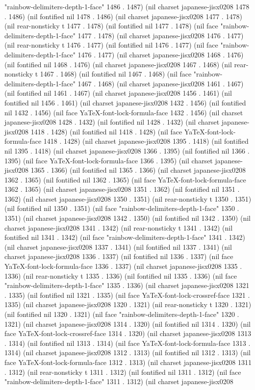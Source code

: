 "rainbow-delimiters-depth-1-face" 1486 . 1487) (nil charset japanese-jisx0208 1478 . 1486) (nil fontified nil 1478 . 1486) (nil charset japanese-jisx0208 1477 . 1478) (nil rear-nonsticky t 1477 . 1478) (nil fontified nil 1477 . 1478) (nil face "rainbow-delimiters-depth-1-face" 1477 . 1478) (nil charset japanese-jisx0208 1476 . 1477) (nil rear-nonsticky t 1476 . 1477) (nil fontified nil 1476 . 1477) (nil face "rainbow-delimiters-depth-1-face" 1476 . 1477) (nil charset japanese-jisx0208 1468 . 1476) (nil fontified nil 1468 . 1476) (nil charset japanese-jisx0208 1467 . 1468) (nil rear-nonsticky t 1467 . 1468) (nil fontified nil 1467 . 1468) (nil face "rainbow-delimiters-depth-1-face" 1467 . 1468) (nil charset japanese-jisx0208 1461 . 1467) (nil fontified nil 1461 . 1467) (nil charset japanese-jisx0208 1456 . 1461) (nil fontified nil 1456 . 1461) (nil charset japanese-jisx0208 1432 . 1456) (nil fontified nil 1432 . 1456) (nil face YaTeX-font-lock-formula-face 1432 . 1456) (nil charset japanese-jisx0208 1428 . 1432) (nil fontified nil 1428 . 1432) (nil charset japanese-jisx0208 1418 . 1428) (nil fontified nil 1418 . 1428) (nil face YaTeX-font-lock-formula-face 1418 . 1428) (nil charset japanese-jisx0208 1395 . 1418) (nil fontified nil 1395 . 1418) (nil charset japanese-jisx0208 1366 . 1395) (nil fontified nil 1366 . 1395) (nil face YaTeX-font-lock-formula-face 1366 . 1395) (nil charset japanese-jisx0208 1365 . 1366) (nil fontified nil 1365 . 1366) (nil charset japanese-jisx0208 1362 . 1365) (nil fontified nil 1362 . 1365) (nil face YaTeX-font-lock-formula-face 1362 . 1365) (nil charset japanese-jisx0208 1351 . 1362) (nil fontified nil 1351 . 1362) (nil charset japanese-jisx0208 1350 . 1351) (nil rear-nonsticky t 1350 . 1351) (nil fontified nil 1350 . 1351) (nil face "rainbow-delimiters-depth-1-face" 1350 . 1351) (nil charset japanese-jisx0208 1342 . 1350) (nil fontified nil 1342 . 1350) (nil charset japanese-jisx0208 1341 . 1342) (nil rear-nonsticky t 1341 . 1342) (nil fontified nil 1341 . 1342) (nil face "rainbow-delimiters-depth-1-face" 1341 . 1342) (nil charset japanese-jisx0208 1337 . 1341) (nil fontified nil 1337 . 1341) (nil charset japanese-jisx0208 1336 . 1337) (nil fontified nil 1336 . 1337) (nil face YaTeX-font-lock-formula-face 1336 . 1337) (nil charset japanese-jisx0208 1335 . 1336) (nil rear-nonsticky t 1335 . 1336) (nil fontified nil 1335 . 1336) (nil face "rainbow-delimiters-depth-1-face" 1335 . 1336) (nil charset japanese-jisx0208 1321 . 1335) (nil fontified nil 1321 . 1335) (nil face YaTeX-font-lock-crossref-face 1321 . 1335) (nil charset japanese-jisx0208 1320 . 1321) (nil rear-nonsticky t 1320 . 1321) (nil fontified nil 1320 . 1321) (nil face "rainbow-delimiters-depth-1-face" 1320 . 1321) (nil charset japanese-jisx0208 1314 . 1320) (nil fontified nil 1314 . 1320) (nil face YaTeX-font-lock-crossref-face 1314 . 1320) (nil charset japanese-jisx0208 1313 . 1314) (nil fontified nil 1313 . 1314) (nil face YaTeX-font-lock-formula-face 1313 . 1314) (nil charset japanese-jisx0208 1312 . 1313) (nil fontified nil 1312 . 1313) (nil face YaTeX-font-lock-formula-face 1312 . 1313) (nil charset japanese-jisx0208 1311 . 1312) (nil rear-nonsticky t 1311 . 1312) (nil fontified nil 1311 . 1312) (nil face "rainbow-delimiters-depth-1-face" 1311 . 1312) (nil charset japanese-jisx0208 